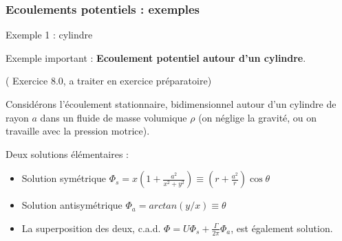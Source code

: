 \subsubsection{Ecoulements potentiels : exemples}





\begin{frame}{Exemple 1 : cylindre} \hypertarget{frame:toto}{}

\small


Exemple important : { \bf Ecoulement potentiel autour d'un cylindre}.

{\color{vert}( Exercice 8.0, a traiter en exercice préparatoire)} 

\medskip

Considérons l'écoulement stationnaire, bidimensionnel autour d'un cylindre de rayon $a$
dans un fluide de masse volumique $\rho$ (on néglige la gravité, ou on travaille avec la pression motrice).
\medskip

Deux solutions élémentaires :

\begin{itemize}
\item Solution symétrique $\Phi_s = x \left( 1 + \frac{a^2}{x^2+y^2} \right)  
\equiv \left(r + \frac{a^2}{r} \right) \cos \theta$  

\item Solution antisymétrique $\Phi_a = arctan( y/x) \equiv \theta$ 

\end{itemize}

\pause

\begin{itemize}

\item La superposition des deux, c.a.d. $\Phi = U \Phi_s + \frac{\Gamma}{2 \pi} \Phi_a$, est également solution.

\end{itemize}

\medskip




\end{frame}

